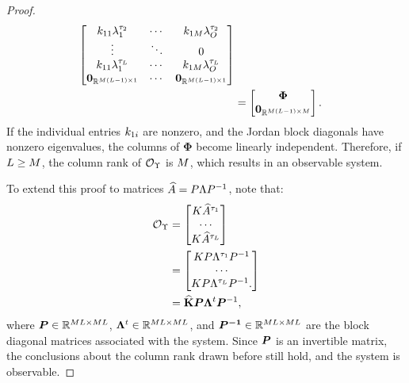 \begin{proof}
\begin{align*}
\begin{bmatrix}
	k_{11}\lambda_1^{\tau_2} & \cdots & k_{1M}\lambda_{O}^{\tau_2}\\
	\vdots & \ddots & 0\\
	k_{11}\lambda_1^{\tau_{L}} & \cdots 
	& k_{1M}\lambda_{O}^{\tau_{L}}\\
	\mathbf{0}_{\mathbb{R}^{M(L-1)\times1}} & \cdots & \mathbf{0}_{\mathbb{R}^{M(L-1)\times1}}
	\end{bmatrix}\\
	&= 
	\begin{bmatrix}
	\boldsymbol{\Phi}\\
	\mathbf{0}_{\mathbb{R}^{M(L-1)\times M}}
	\end{bmatrix}.
	\end{align*}
	If the individual entries $k_{1i}$ are nonzero, and the Jordan block diagonals have nonzero eigenvalues, the columns of $\boldsymbol\Phi$
	become linearly independent. Therefore, if $L \geq M$, the column rank of $\mathcal{O}_{\Upsilon}$ is $M$, which results in an observable system.
	
	To extend this proof to matrices $\widehat{A} = P\Lambda P^{-1}$, note that:
	\begin{align*}
	\mathcal{O}_{\Upsilon} &= 
	\begin{bmatrix}
	K \widehat{A}^{\tau_1}\\
	\cdots\\
	K \widehat{A}^{\tau_L}
	\end{bmatrix}\\
	&=
	\begin{bmatrix}
	K P\Lambda^{\tau_1}P^{-1}\\
	\cdots\\
	K P\Lambda^{\tau_L}P^{-1}.
	\end{bmatrix}\\
	&=
	\widehat{\mathbf{K}}
	\boldsymbol{P}
	\boldsymbol{\Lambda}^t
	\boldsymbol{P}^{-1},
	\end{align*} 
	where $\boldsymbol{P}\in\mathbb{R}^{ML\times ML}$, $\boldsymbol{\Lambda}^t\in\mathbb{R}^{ML\times ML}$, and
	$\boldsymbol{P^{-1}}\in\mathbb{R}^{ML\times ML}$ are the block diagonal matrices associated with the system. 
	Since $\boldsymbol{P}$ is an invertible matrix, the conclusions about the column rank drawn before still hold, and the system is observable. 
\end{proof}


